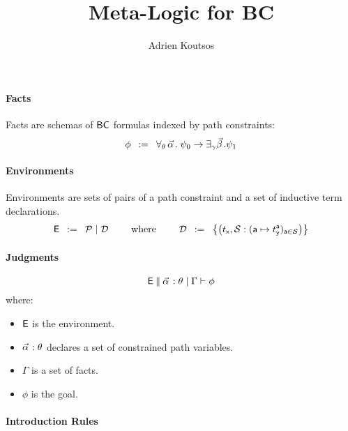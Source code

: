 \documentclass[a4paper]{article}
\theoremstyle{remark}
\begin{document}
\title{Meta-Logic for BC}


\author{Adrien Koutsos}

\maketitle

\paragraph{Facts}
Facts are schemas of $\bc$ formulas indexed by path constraints:
\[
  \phi \mdef
  \cforall_\theta\, \valpha.\;
  \psi_0
  \ra
  \cexists_\gamma \vbeta. \psi_1
\]

\paragraph{Environments}
Environments are sets of pairs of a path constraint and a set of inductive term declarations.
\[
  \env \mdef
  \pcnstr \mid
  \decls
  \qquad
  \text{ where }
  \qquad
  \decls \mdef
  \left\{
    \decl{t_\sfx}{\aset}
    {(\act \mapsto t_\sfy^\act)_{\act \in \aset}}
  \right\}
\]

\paragraph{Judgments}
\[
  \judge{\env}{\facts{\valpha}{\theta}{\Gamma}}{\phi}
\]
where:
\begin{itemize}
\item $\env$ is the environment.
\item $\pvtype{\valpha}{\theta}$ declares a set of constrained path variables.
\item $\Gamma$ is a set of facts.
\item $\phi$ is the goal.
\end{itemize}

\paragraph{Introduction Rules}
\begin{mathpar}

\end{mathpar}
\end{document}

